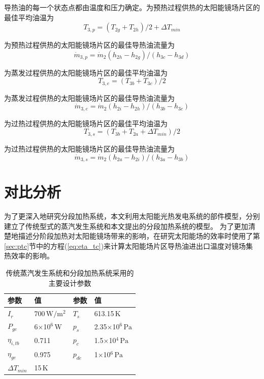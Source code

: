 导热油的每一个状态点都由温度和压力确定。为预热过程供热的太阳能镜场片区的最佳平均油温为
\begin{equation}
  T_{3,p} = (T_{2g} + T_{2h})/2 + \Delta T_{min}
\end{equation}

为预热过程供热的太阳能镜场片区的最佳导热油流量为
\begin{equation}
  \dot{m}_{3,p} = \dot{m}_{2}(h_{2h} - h_{2g})/(h_{3c} - h_{3d})
\end{equation}

为蒸发过程供热的太阳能镜场片区的最佳平均油温为
\begin{equation}
  T_{3,e} = (T_{3b} + T_{3c})/2
\end{equation}

为蒸发过程供热的太阳能镜场片区的最佳导热油流量为
\begin{equation}
  \dot{m}_{3,e} = \dot{m}_{2}(h_{2i} - h_{2h})/(h_{3b} - h_{3c})
  \label{eq:m_3e}
\end{equation}

为过热过程供热的太阳能镜场片区的最佳平均油温为
\begin{equation}
  T_{3,s} = (T_{3b} + T_{2a} + \Delta T_{min})/2
\end{equation}

为过热过程供热的太阳能镜场片区的最佳导热油流量为
\begin{equation}
  \dot{m}_{3,s} = \dot{m}_{2}(h_{2a} - h_{2i})/(h_{3a} - h_{3b})
\end{equation}

\section{对比分析}

为了更深入地研究分段加热系统，本文利用太阳能光热发电系统的部件模型，分别建立了传统型式的蒸汽发生系统和本文提出的分段加热系统的模型。
为了更加清楚地描述分阶段加热对太阳能镜场带来的影响，在研究太阳能场的效率时使用了第\ref{sec:ptc}节中的方程(\ref{eq:eta_tc})来计算太阳能场片区导热油进出口温度对镜场集热效率的影响。

\begin{table}[htbp]
\setlength{\abovecaptionskip}{-10pt}
	\caption{传统蒸汽发生系统和分段加热系统采用的主要设计参数}
	\begin{center}
	\begin{tabular}{p{1.5cm}<{\centering} p{3.5cm}<{\centering} p{1.5cm}<{\centering} p{3.5cm}<{\centering}}
		\toprule
		参数		&	值	&	参数		&	值\\
		\midrule
		$I_r$	&	700$\,\mathrm{W/m^2}$	&	$T_s$		&	613.15$\,\mathrm{K}$\\
		$P_{ge}$	&	6$\times$10$^6\,\mathrm{W}$	&	$p_s$		&	2.35$\times$10$^6\,\mathrm{Pa}$\\
		$\eta_{i,tb}$	&	0.711	&	$p_c$		&	1.5$\times$10$^4\,\mathrm{Pa}$\\
		$\eta_{ge}$	&	0.975	&	$p_{de}$		&	1$\times$10$^6\,\mathrm{Pa}$\\
		$\Delta T_{min}$	&	15$\,\mathrm{K}$	&	&\\		
		\bottomrule
	\end{tabular}
	\end{center}
	\label{tab:ptc}
\end{table}

